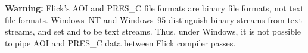 \textbf{Warning:} Flick's AOI and PRES\_C file formats are binary file formats,
not text file formats.  Windows~NT and Windows~95 distinguish binary streams
from text streams, and set  and  to be text
streams.  Thus, under Windows, it is not possible to pipe AOI and PRES\_C data
between Flick compiler passes.




